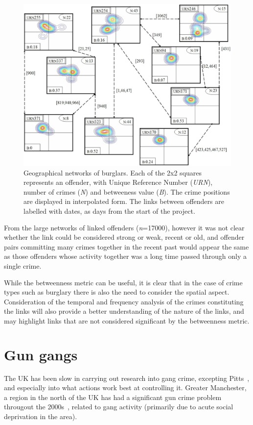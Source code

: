 \documentclass[conference]{IEEEtran}
\theoremstyle{definition}
\begin{document}
\begin{figure}[!ht] 
\centering
\includegraphics[width=\columnwidth]{images/burglary}
\caption{Geographical networks of burglars. Each of the 2x2 squares represents an offender, with Unique Reference Number (\emph{URN}), number of crimes (\emph{N}) and betweeness value (\emph{B}). The crime positions are displayed in interpolated form. The links between offenders are labelled with dates, as days from the start of the project.}
\label{fig:burglary}
\end{figure}

From the large networks of linked offenders (\emph{n}=17000), however
it was not clear whether the link could be considered strong or weak,
recent or old, and offender pairs committing many crimes together in
the recent past would appear the same as those offenders whose
activity together was a long time passed through only a single crime.

While the betweenness metric can be useful, it is clear that in the
case of crime types such as burglary there is also the need to consider
the spatial aspect. Consideration of the temporal and frequency
analysis of the crimes constituting the links will also provide a
better understanding of the nature of the links, and may highlight
links that are not considered significant by the betweenness metric.

\section{Gun gangs}\label{sec:manchester}
The UK has been slow in carrying out research into gang crime,
excepting Pitts~\cite{pitts:2007}, and especially into what actions
work best at controlling it. Greater Manchester, a region in the north
of the UK has had a significant gun crime problem througout the
2000s~\cite{BBCNews2003,HalesLewisSilverstone2006}, related to gang
activity (primarily due to acute social deprivation in the area).
\end{document}
